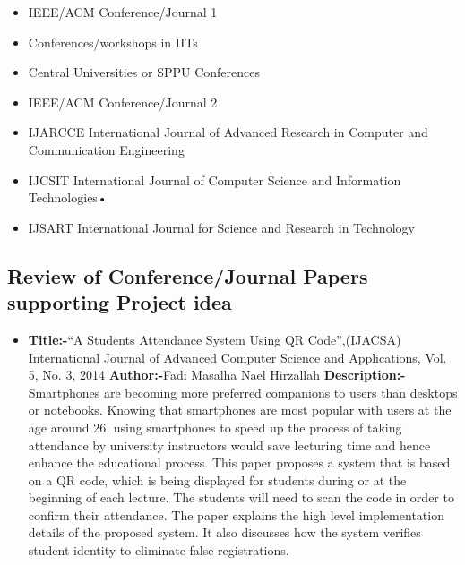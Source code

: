 \documentclass[10pt,a4paper]
{article}
\numberwithin{table}{section}
\begin{document}
{{\begin{normalsize}
\begin{itemize}
\item IEEE/ACM Conference/Journal 1
\item Conferences/workshops in IITs
\item Central Universities or SPPU Conferences
\item IEEE/ACM Conference/Journal 2
\item IJARCCE  International  Journal  of  Advanced  Research  in  Computer and Communication Engineering
\item IJCSIT  International  Journal  of  Computer  Science  and  Information Technologies•
\item IJSART International Journal for Science and Research in Technology
\end{itemize}

\subsection{Review of Conference/Journal Papers supporting Project idea}
\begin{itemize}
\item{\textbf{Title:-}{“A Students Attendance System Using QR Code”,(IJACSA) International Journal of Advanced Computer                 Science and Applications, Vol. 5, No. 3, 2014 }\newline
\textbf{Author:-}{Fadi Masalha 
Nael Hirzallah   
 } \newline
\textbf{Description:-}{Smartphones are becoming more preferred companions to users than desktops or notebooks. Knowing that smartphones are most popular with users at the age around 26, using smartphones to speed up the process of taking attendance by university instructors would save lecturing time and hence enhance the educational process. This paper proposes a system that is based on a QR code, which is being displayed for students during or at the beginning of each lecture. The students will need to scan the code in order to confirm their attendance. The paper explains the high level implementation details of the proposed system. It also discusses how the system verifies student identity to eliminate false registrations.}}


\end{itemize}
\end{normalsize}}}
\end{document}
